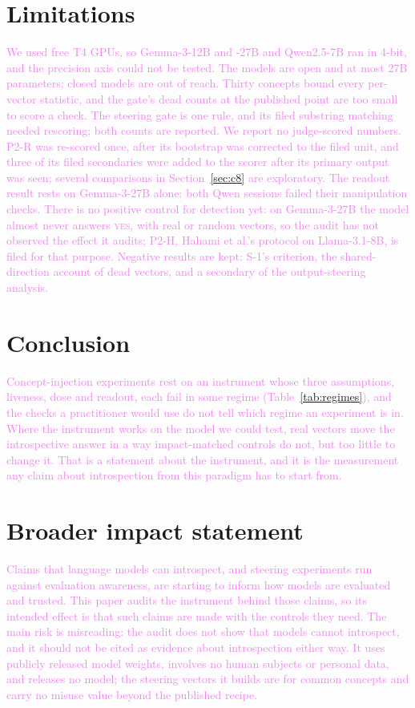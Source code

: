 \documentclass[11pt,a4paper]{article}
\newcommand{\yes}{\textup{\textsc{yes}}}
\newcommand{\draft}[1]{\textcolor{violet}{#1}}
\begin{document}
\section{Limitations}
\label{sec:limits}
\draft{We used free T4 GPUs, so Gemma-3-12B and -27B and Qwen2.5-7B ran in 4-bit, and the precision
axis could not be tested. The models are open and at most 27B parameters; closed models are out of
reach. Thirty concepts bound every per-vector statistic, and the gate's dead counts at the
published point are too small to score a check. The steering gate is one rule, and its filed
substring matching needed rescoring; both counts are reported. We report no judge-scored numbers.
P2-R was re-scored once, after its bootstrap was corrected to the filed unit, and three of its
filed secondaries were added to the scorer after its primary output was seen; several comparisons
in Section~\ref{sec:c8} are exploratory. The readout result rests on Gemma-3-27B alone: both Qwen
sessions failed their manipulation checks. There is no positive control for detection yet: on
Gemma-3-27B the model almost never answers \yes{}, with real or random vectors, so the audit has
not observed the effect it audits; P2-H, Hahami et al.'s protocol on Llama-3.1-8B, is filed for
that purpose.
Negative results are kept: S-1's criterion, the shared-direction account of dead vectors, and a
secondary of the output-steering analysis.}

\section{Conclusion}
\draft{Concept-injection experiments rest on an instrument whose three assumptions, liveness,
dose and readout, each fail in some regime (Table~\ref{tab:regimes}), and the checks a practitioner would use do not tell
which regime an experiment is in. Where the instrument works on the model we could test, real
vectors move the introspective answer in a way impact-matched controls do not, but too little
to change it. That is a statement about the instrument, and it is the measurement any claim about
introspection from this paradigm has to start from.}

\section*{Broader impact statement}
\draft{Claims that language models can introspect, and steering experiments run against evaluation
awareness, are starting to inform how models are evaluated and trusted. This paper audits the
instrument behind those claims, so its intended effect is that such claims are made with the
controls they need. The main risk is misreading: the audit does not show that models cannot
introspect, and it should not be cited as evidence about introspection either way. It uses
publicly released model weights, involves no human subjects or personal data, and releases no
model; the steering vectors it builds are for common concepts and carry no misuse value beyond
the published recipe.}
\end{document}
